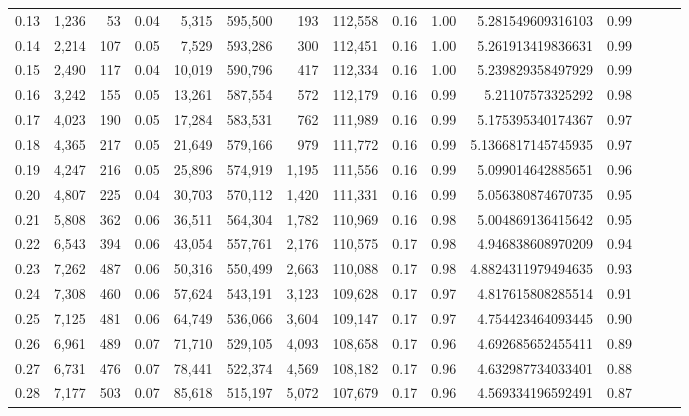 \begin{tabular}{rrrrrrrrrrrrrrr}
0.13 &   1,236 &     53 &  0.04 &    5,315 &  595,500 &      193 &  112,558 &  0.16 &  1.00 &       5.281549609316103 &      0.99 \\
0.14 &   2,214 &    107 &  0.05 &    7,529 &  593,286 &      300 &  112,451 &  0.16 &  1.00 &       5.261913419836631 &      0.99 \\
0.15 &   2,490 &    117 &  0.04 &   10,019 &  590,796 &      417 &  112,334 &  0.16 &  1.00 &       5.239829358497929 &      0.99 \\
0.16 &   3,242 &    155 &  0.05 &   13,261 &  587,554 &      572 &  112,179 &  0.16 &  0.99 &        5.21107573325292 &      0.98 \\
0.17 &   4,023 &    190 &  0.05 &   17,284 &  583,531 &      762 &  111,989 &  0.16 &  0.99 &       5.175395340174367 &      0.97 \\
0.18 &   4,365 &    217 &  0.05 &   21,649 &  579,166 &      979 &  111,772 &  0.16 &  0.99 &      5.1366817145745935 &      0.97 \\
0.19 &   4,247 &    216 &  0.05 &   25,896 &  574,919 &    1,195 &  111,556 &  0.16 &  0.99 &       5.099014642885651 &      0.96 \\
0.20 &   4,807 &    225 &  0.04 &   30,703 &  570,112 &    1,420 &  111,331 &  0.16 &  0.99 &       5.056380874670735 &      0.95 \\
0.21 &   5,808 &    362 &  0.06 &   36,511 &  564,304 &    1,782 &  110,969 &  0.16 &  0.98 &       5.004869136415642 &      0.95 \\
0.22 &   6,543 &    394 &  0.06 &   43,054 &  557,761 &    2,176 &  110,575 &  0.17 &  0.98 &       4.946838608970209 &      0.94 \\
0.23 &   7,262 &    487 &  0.06 &   50,316 &  550,499 &    2,663 &  110,088 &  0.17 &  0.98 &      4.8824311979494635 &      0.93 \\
0.24 &   7,308 &    460 &  0.06 &   57,624 &  543,191 &    3,123 &  109,628 &  0.17 &  0.97 &       4.817615808285514 &      0.91 \\
0.25 &   7,125 &    481 &  0.06 &   64,749 &  536,066 &    3,604 &  109,147 &  0.17 &  0.97 &       4.754423464093445 &      0.90 \\
0.26 &   6,961 &    489 &  0.07 &   71,710 &  529,105 &    4,093 &  108,658 &  0.17 &  0.96 &       4.692685652455411 &      0.89 \\
0.27 &   6,731 &    476 &  0.07 &   78,441 &  522,374 &    4,569 &  108,182 &  0.17 &  0.96 &       4.632987734033401 &      0.88 \\
0.28 &   7,177 &    503 &  0.07 &   85,618 &  515,197 &    5,072 &  107,679 &  0.17 &  0.96 &       4.569334196592491 &      0.87 \\

\end{tabular}
